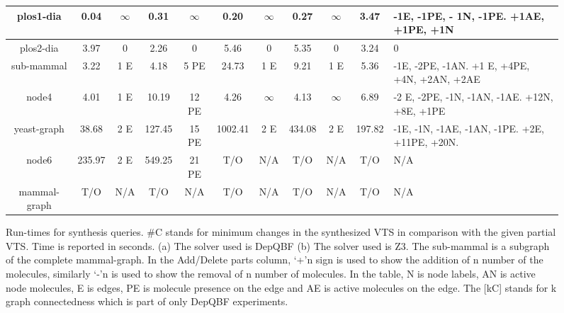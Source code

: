 \begin{sidewaysfigure}[t]
\begin{tabular}[t]{|c@{}|@{}c@{}|@{}c@{}|@{}c@{}|@{}c@{}|@{}c@{}|@{}c@{}|@{}c@{}|@{}c@{}|@{}c@{}|@{}C{4cm}@{}|}
		plos1-dia & 0.04&$\infty$& 0.31 &$\infty$& 0.20 & $\infty$ & 0.27&$\infty$& 3.47 & -1E, -1PE, - 1N, -1PE. +1AE, +1PE, +1N\\\hline
		plos2-dia & 3.97 & 0 &  2.26 & 0  & 5.46 & 0 & 5.35 & 0 & 3.24 & 0 \\\hline
		sub-mammal & 3.22 & 1 E  & 4.18 & 5 PE  & 24.73 & 1 E  & 9.21 & 1 E & 5.36  & -1E, -2PE, -1AN. +1 E, +4PE, +4N, +2AN, +2AE \\\hline
		node4  & 4.01  & 1 E  & 10.19  & 12 PE & 4.26  & $\infty$ & 4.13 &$\infty$&  6.89  & -2 E, -2PE, -1N, -1AN, -1AE. +12N, +8E, +1PE \\\hline
		yeast-graph & 38.68  & 2 E  &   127.45  & 15 PE   & 1002.41  & 2 E  & 434.08   & 2 E & 197.82  &  -1E, -1N, -1AE, -1AN, -1PE. +2E, +11PE, +20N. \\\hline
		node6  &  235.97  & 2 E  &  549.25    & 21 PE    &  T/O  & N/A      &  T/O   &  N/A   &  T/O     & N/A \\\hline
		mammal-graph   &  T/O     & N/A  &  T/O    & N/A    &  T/O  & N/A      &  T/O   &  N/A   &  T/O     & N/A\\\hline
	\end{tabular}
	\caption{Run-times for synthesis queries. \#C stands for minimum changes in the synthesized VTS in comparison with the given partial VTS. Time is reported in seconds. (a) The solver used is DepQBF (b) The solver used is Z3. The sub-mammal is a subgraph of the complete mammal-graph. In the Add/Delete parts column, ‘+’n sign is used to show the addition of n number of the molecules, similarly ‘-’n is used to show the removal of n number of molecules. In the table, N is node labels, AN is active node molecules, E is edges, PE is molecule presence on the edge and AE is active molecules on the edge. The [kC] stands for k graph connectedness which is part of only DepQBF experiments.}
	
	\label{tab:synth-graph}
\end{sidewaysfigure}
